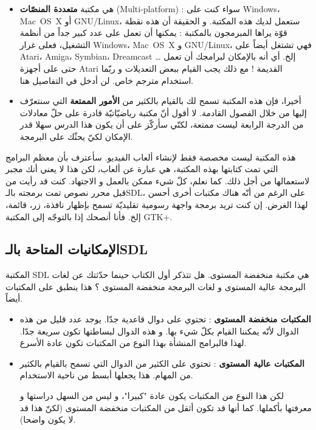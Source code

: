 \begin{itemize}
 	\item هي مكتبة
 	\textbf{متعددة المنصّات} 
 	(\textenglish{Multi-platform}) :
 	سواء كنت على
 	\textenglish{Windows}،
 	\textenglish{\mbox{Mac OS X}}
 	أو
 	\textenglish{\mbox{GNU/Linux}}،
 	ستعمل لديك هذه المكتبة. و الحقيقة أن هذه نقطة قوّة يراها المبرمجون بالمكتبة : يمكنها أن تعمل على عدد كبير جداً من أنظمة التشغيل، فعلى غرار 
 	 	\textenglish{Windows}،
 	\textenglish{\mbox{Mac OS X}}
 	و
 	\textenglish{\mbox{GNU/Linux}}،
 	فهي تشتغل أيضاً على 
 	\textenglish{Atari}، \textenglish{Amiga}، \textenglish{Symbian}، \textenglish{Dreamcast} \dots
 	إلخ. أي أنه بالإمكان لبرامجك أن تعمل حتى على أجهزة 
 	\textenglish{Atari}
 	القديمة ! مع ذلك يجب القيام ببعض التعديلات و ربّما استخدام مترجم خاص. لن أدخل في التفاصيل هنا.
 	\item أخيرا، فإن هذه المكتبة تسمح لك بالقيام بالكثير من 
 	\textbf{الأمور الممتعة}
 	التي سنتعرّف إليها من خلال الفصول القادمة. لا أقول أنّ مكتبة رياضيّاتيّة قادرة على حلّ معادلات من الدرجة الرابعة ليست ممتعة، لكنّي سأركّز على أن يكون هذا الدرس سهلا قدر الإمكان لكيّ يحثّك على البرمجة.
\end{itemize}

هذه المكتبة ليست مخصصة فقط لإنشاء ألعاب الفيديو. سأعترف بأن معظم البرامج التي تمت كتابتها بهذه المكتبة، هي عبارة عن ألعاب، لكن هذا لا يعني أنك مجبر لاستعمالها من أجل ذلك. كما نعلم، كلّ شيء ممكن بالعمل و الاجتهاد. كنت قد رأيت من قبل محرر نصوص تمت برمجته بالـ\textenglish{SDL}،
على الرغم من أنّه هناك مكتبات أخرى أحسن لهذا الغرض. إن كنت تريد برمجة واجهة رسومية تقليديّة تسمح بإظهار نافذة، زر، قائمة، إلخ. فأنا أنصحك إذا بالتوجّه إلى المكتبة 
\textenglish{GTK+}.

\subsection{الإمكانيات المتاحة بالـ\textenglish{SDL}}

المكتبة
\textenglish{SDL}
هي مكتبة منخفضة المستوى. هل تتذكر أول الكتاب حينما حدّثتك عن لغات البرمجة عالية المستوى و لغات البرمجة منخفضة المستوى ؟ هذا ينطبق على المكتبات أيضاً.

\begin{itemize}
	\item \textbf{المكتبات منخفضة المستوى} : 
	تحتوي على دوال قاعدية جدّا. يوجد عدد قليل من هذه الدوال لأنّه يمكننا القيام بكلّ شيء بها. و هذه الدوال لبساطتها تكون سريعة جدّا. لهذا فالبرامج المنشأة بهذا النوع من المكتبات تكون عادة الأسرع.
	\item \textbf{المكتبات عالية المستوى} : 
	تحتوي على الكثير من الدوال التي تسمح بالقيام بالكثير من المهام. هذا يجعلها أبسط من ناحية الاستخدام.
	
	لكن هذا النوع من المكتبات يكون عادة "كبيرا"، و ليس من السهل دراستها و معرفتها بأكملها. كما أنها قد تكون أثقل من المكتبات منخفضة المستوى (لكنّ هذا قد لا يكون واضحا).
\end{itemize}

